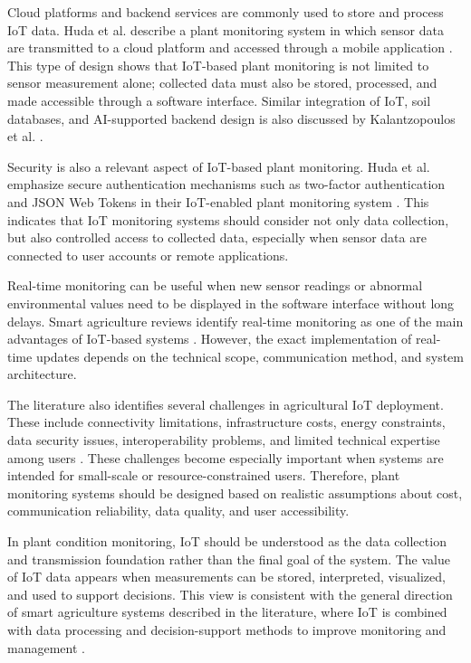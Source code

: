Cloud platforms and backend services are commonly used to store and process IoT data. Huda et al. describe a plant monitoring system in which sensor data are transmitted to a cloud platform and accessed through a mobile application \cite{huda2024iot}. This type of design shows that IoT-based plant monitoring is not limited to sensor measurement alone; collected data must also be stored, processed, and made accessible through a software interface. Similar integration of IoT, soil databases, and AI-supported backend design is also discussed by Kalantzopoulos et al. \cite{kalantzopoulos2024wesis}.

Security is also a relevant aspect of IoT-based plant monitoring. Huda et al. emphasize secure authentication mechanisms such as two-factor authentication and JSON Web Tokens in their IoT-enabled plant monitoring system \cite{huda2024iot}. This indicates that IoT monitoring systems should consider not only data collection, but also controlled access to collected data, especially when sensor data are connected to user accounts or remote applications.

Real-time monitoring can be useful when new sensor readings or abnormal environmental values need to be displayed in the software interface without long delays. Smart agriculture reviews identify real-time monitoring as one of the main advantages of IoT-based systems \cite{ahmed2024smart,mowla2023iot}. However, the exact implementation of real-time updates depends on the technical scope, communication method, and system architecture.

The literature also identifies several challenges in agricultural IoT deployment. These include connectivity limitations, infrastructure costs, energy constraints, data security issues, interoperability problems, and limited technical expertise among users \cite{miller2025iot,nawaz2025iot}. These challenges become especially important when systems are intended for small-scale or resource-constrained users. Therefore, plant monitoring systems should be designed based on realistic assumptions about cost, communication reliability, data quality, and user accessibility.

In plant condition monitoring, IoT should be understood as the data collection and transmission foundation rather than the final goal of the system. The value of IoT data appears when measurements can be stored, interpreted, visualized, and used to support decisions. This view is consistent with the general direction of smart agriculture systems described in the literature, where IoT is combined with data processing and decision-support methods to improve monitoring and management \cite{mowla2023iot,qazi2022iot,ahmed2024smart}.

